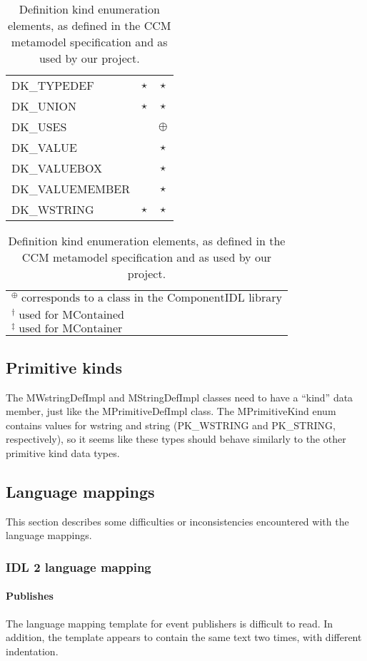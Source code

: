 \begin{table}
\begin{tabular}{|l|c|c|}
DK\_TYPEDEF       & $\star$ & $\star$    \\
DK\_UNION         & $\star$ & $\star$    \\ \hline
DK\_USES          &         & $\oplus$   \\
DK\_VALUE         &         & $\star$    \\
DK\_VALUEBOX      &         & $\star$    \\
DK\_VALUEMEMBER   &         & $\star$    \\
DK\_WSTRING       & $\star$ & $\star$    \\ \hline
\end{tabular}
\begin{tabular}{l}
\\
$^\oplus\;\mbox{corresponds to a class in the ComponentIDL library}$ \\
$^\dagger\;\mbox{used for MContained}$ \\
$^\ddagger\;\mbox{used for MContainer}$
\end{tabular}
\label{table:component-definition-kinds}
\caption{Definition kind enumeration elements, as defined in the CCM metamodel
specification and as used by our project.}
\end{table}

\subsection{Primitive kinds}

The MWstringDefImpl and MStringDefImpl classes need to have a ``kind'' data
member, just like the MPrimitiveDefImpl class. The MPrimitiveKind enum contains
values for wstring and string (PK\_WSTRING and PK\_STRING, respectively), so it
seems like these types should behave similarly to the other primitive kind data
types.

\subsection{Language mappings}

This section describes some difficulties or inconsistencies encountered with the
language mappings.

\subsubsection{IDL 2 language mapping}

\paragraph{Publishes}

The language mapping template for event publishers is difficult to read. In
addition, the template appears to contain the same text two times, with
different indentation.

